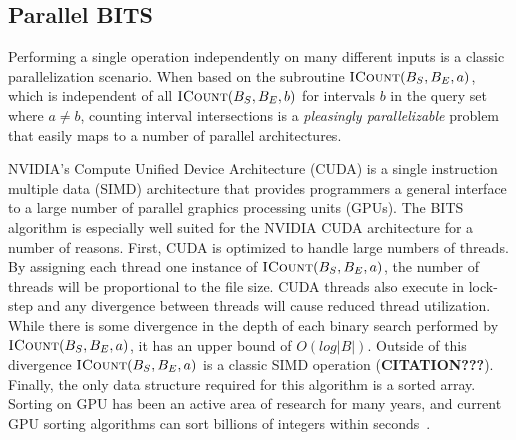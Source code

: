 \documentclass{bioinfo}
\begin{document}


	\subsection{Parallel BITS}

	Performing a single operation independently on many different inputs
	is a classic parallelization scenario.  When based on the subroutine
	$\textsc{ICount}(B_S,B_E,a)$, which is independent of all
	$\textsc{ICount}(B_S,B_E,b)$ for intervals $b$ in the query set where
	$a \neq b$, counting interval intersections is a 
	{\em pleasingly parallelizable} problem that easily maps to a 
	number of parallel architectures.

	NVIDIA's Compute Unified Device Architecture (CUDA) is a single instruction
	multiple data (SIMD) architecture that provides programmers a general interface
	to a large number of parallel graphics processing units (GPUs).  The BITS
	algorithm is especially well suited for the NVIDIA CUDA architecture for a
	number of reasons.  First, CUDA is optimized to handle large numbers of
	threads.  By assigning each thread one instance of
	$\textsc{ICount}(B_S,B_E,a)$, the number of threads will be proportional to
	the file size.  CUDA threads also execute in lock-step and any divergence
	between threads will cause reduced thread utilization.  While there is some
	divergence in the depth of each binary search performed by
	$\textsc{ICount}(B_S,B_E,a)$, it has an upper bound of $O(log |B|)$.  Outside
	of this divergence $\textsc{ICount}(B_S,B_E,a)$ is a classic SIMD operation
	(\textbf{CITATION???}).
	Finally, the only data structure required for this algorithm is a sorted
	array.  Sorting on GPU has been an active area of research for many years, and
	current GPU sorting algorithms can sort billions of integers within
	seconds~\cite{merrill2011}.
	
\end{document}
